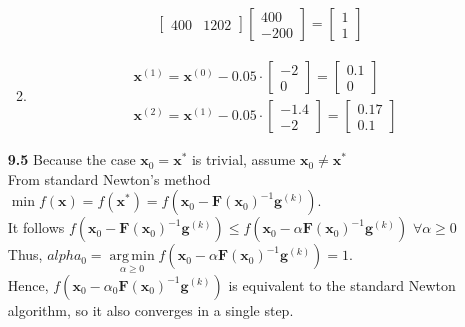 \documentclass[10pt]{article}
\DeclareMathOperator*{\argmin}{arg\,min}
\begin{document}
\begin{enumerate}
\begin{enumerate}
\begin{align*}
\begin{bmatrix}
                400 & 1202
            \end{bmatrix}\begin{bmatrix}
                400\\
                -200
            \end{bmatrix}=\begin{bmatrix}
                1\\
                1
            \end{bmatrix}
        \end{align*}
        \item \begin{align*}
            &\mathbf{x}^{(1)}=\mathbf{x}^{(0)}-0.05\cdot\begin{bmatrix}
                -2\\
                0
            \end{bmatrix}=\begin{bmatrix}
                0.1\\
                0
            \end{bmatrix}\\
            & \mathbf{x}^{(2)}=\mathbf{x}^{(1)}-0.05\cdot\begin{bmatrix}
                -1.4\\
                -2
            \end{bmatrix}=\begin{bmatrix}
                0.17\\
                0.1
            \end{bmatrix}
        \end{align*}
    \end{enumerate}
    \item [\textbf{9.5}] Because the case $\mathbf{x}_0=\mathbf{x}^*$ is trivial, assume $\mathbf{x}_0\neq\mathbf{x}^*$\\
    From standard Newton's method $\min f(\mathbf{x})=f(\mathbf{x}^*)=f(\mathbf{x}_0-{\mathbf{F}(\mathbf{x}_0)}^{-1}\mathbf{g}^{(k)})$.\\
    It follows $f(\mathbf{x}_0-{\mathbf{F}(\mathbf{x}_0)}^{-1}\mathbf{g}^{(k)})\le f(\mathbf{x}_0-\alpha{\mathbf{F}(\mathbf{x}_0)}^{-1}\mathbf{g}^{(k)})$ $\forall \alpha\ge 0$\\
    Thus, $alpha_0=\underset{\alpha\ge 0}{\argmin}f(\mathbf{x}_0-\alpha{\mathbf{F}(\mathbf{x}_0)}^{-1}\mathbf{g}^{(k)})=1$.\\
    Hence, $f(\mathbf{x}_0-\alpha_0{\mathbf{F}(\mathbf{x}_0)}^{-1}\mathbf{g}^{(k)})$ is equivalent to the standard Newton algorithm, so it also converges in a single step.

\end{enumerate}
\end{document}
